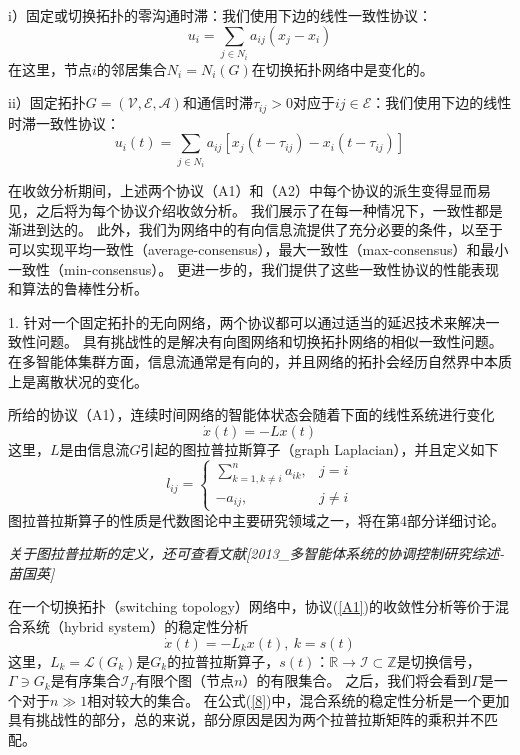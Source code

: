 \documentclass{article}
\begin{document}
i）固定或切换拓扑的零沟通时滞：我们使用下边的线性一致性协议：
\begin{equation}
    u_i = \sum_{j\in N_i}a_{ij}(x_j-x_i) \tag{A1} \label{A1}
\end{equation}
\indent 在这里，节点$i$的邻居集合$N_i=N_i(G)$在切换拓扑网络中是变化的。

ii）固定拓扑$G=(\mathcal{V}, \mathcal{E}, \mathcal{A})$和通信时滞$\tau_{ij}>0$对应于$ij\in \mathcal{E}$：我们使用下边的线性时滞一致性协议：
\begin{equation}
    u_i(t) = \sum_{j\in N_i}a_{ij}[x_j(t-\tau_{ij})-x_i(t-\tau_{ij})] \tag{A2}
\end{equation}

在收敛分析期间，上述两个协议（A1）和（A2）中每个协议的派生变得显而易见，之后将为每个协议介绍收敛分析。
我们展示了在每一种情况下，一致性都是渐进到达的。
此外，我们为网络中的有向信息流提供了充分必要的条件，以至于可以实现平均一致性（average-consensus），最大一致性（max-consensus）和最小一致性（min-consensus）。
更进一步的，我们提供了这些一致性协议的性能表现和算法的鲁棒性分析。

 1. 针对一个固定拓扑的无向网络，两个协议都可以通过适当的延迟技术来解决一致性问题。
具有挑战性的是解决有向图网络和切换拓扑网络的相似一致性问题。
在多智能体集群方面，信息流通常是有向的，并且网络的拓扑会经历自然界中本质上是离散状况的变化。

所给的协议（A1），连续时间网络的智能体状态会随着下面的线性系统进行变化
\begin{equation}
    \dot{x}(t) = -Lx(t) \label{6}
\end{equation}
这里，$L$是由信息流$G$引起的图拉普拉斯算子（graph Laplacian），并且定义如下
\begin{equation}
l_{ij} = \left\{
    \begin{array}{ll}
        \sum_{k=1,k\ne i}^n a_{ik}, & j=i\\
        -a_{ij}, & j\ne i
    \end{array}\right.
    \label{7}
\end{equation}
图拉普拉斯算子的性质是代数图论中主要研究领域之一，将在第4部分详细讨论。

{\color[gray]{0.5} \em 关于图拉普拉斯的定义，还可查看文献[2013\_多智能体系统的协调控制研究综述-苗国英]}

在一个切换拓扑（switching topology）网络中，协议(\ref{A1})的收敛性分析等价于混合系统（hybrid system）的稳定性分析
\begin{equation}
    \dot{x}(t) = -L_kx(t),\ k=s(t) \label{8}
\end{equation}
这里，$L_k = \mathcal{L}(G_k)$是$G_k$的拉普拉斯算子，$s(t)$：$\mathbb{R}\rightarrow \mathcal{I} \subset \mathbb{Z}$是切换信号，$\Gamma\ni G_k$是有序集合$\mathcal{I}_\Gamma$有限个图（节点$n$）的有限集合。
之后，我们将会看到$\Gamma$是一个对于$n\gg 1$相对较大的集合。
在公式(\ref{8})中，混合系统的稳定性分析是一个更加具有挑战性的部分，总的来说，部分原因是因为两个拉普拉斯矩阵的乘积并不匹配。
\end{document}
